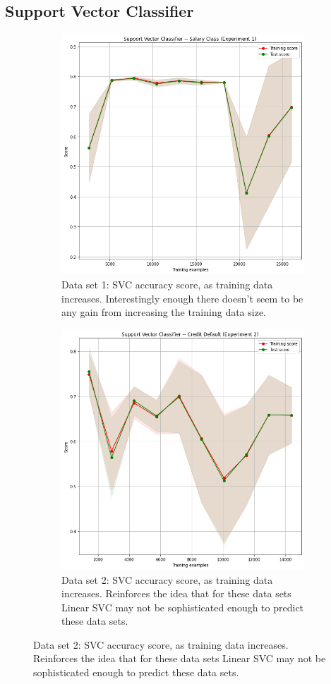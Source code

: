 \documentclass[
	letterpaper, %
]{IEEEtran}
\begin{document}
	\subsection{Support Vector Classifier}
		\begin{figure}[h]
			\begin{subfigure}{.5\textwidth}
				\centering
				\includegraphics[width=.8\linewidth]{./images/svcExp1.png}
				\caption{Data set 1: SVC accuracy score, as training data increases. Interestingly enough there doesn't seem to be any gain from increasing the training data size.}
				\label{fig:svcExp1}
			\end{subfigure}
			\begin{subfigure}{.5\textwidth}
				\centering
				\includegraphics[width=.8\linewidth]{./images/svcExp2.png}
				\caption{Data set 2: SVC accuracy score, as training data increases. Reinforces the idea that for these data sets Linear SVC may not be sophisticated enough to predict these data sets.}
				\label{fig:svcExp2}
			\end{subfigure}
		\end{figure}
\end{document}
